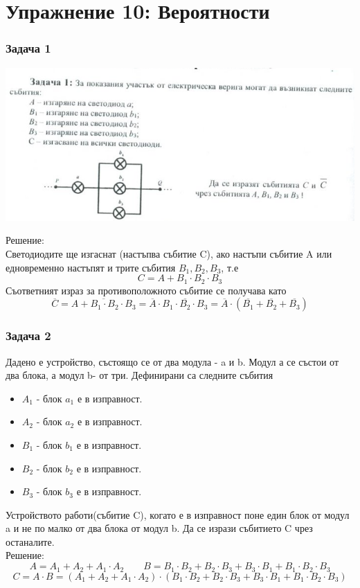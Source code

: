 \documentclass[fleqn, 12pt]{article}
\theoremstyle{definition}
\begin{document}
\newpage
\section{ Упражнение 10: Вероятности}

\subsubsection*{Задача 1}
\begin{center}
\includegraphics{Pics/Discrete math/ex10/ex10-task1.png}
\end{center}
Решение: \\
Светодиодите ще изгаснат (настъпва събитие C), ако настъпи събитие A или едновременно настъпят и трите събития $B_1, B_2, B_3$, т.е
$$C = A + B_1 \cdot B_2 \cdot B_3$$
Съответният израз за противоположното събитие се получава като
$$\overline{C} = \overline{A + B_1 \cdot B_2 \cdot B_3} = \overline{A} \cdot \overline{B_1 \cdot B_2 \cdot B_3} =  \overline{A} \cdot  ( \overline{B_1} +  \overline{B_2} +  \overline{B_3} )$$

\subsubsection*{Задача 2}
Дадено е устройство, състоящо се от два модула - a и b. Модул а се състои от два блока, а модул b- от три. Дефинирани са следните събития \\
\begin{itemize}
\item $A_1$ - блок $a_1$ е в изправност. 
\item $A_2$ - блок $a_2$ е в изправност. 
\item $B_1$ - блок $b_1$ е в изправност. 
\item $B_2$ - блок $b_2$ е в изправност. 
\item $B_3$ - блок $b_3$ е в изправност. 
\end{itemize}
Устройството работи(събитие C), когато е в изправност поне един блок от модул a и не по малко от два блока от модул b. Да се изрази събитието C чрез останалите. \\
Решение:\\
$$A = A_1 + A_2 + A_1 \cdot A_2 \qquad 
B = B_1 \cdot B_2 + B_2 \cdot B_3 + B_3 \cdot B_1 + B_1 \cdot B_2 \cdot B_3$$
$$C = A \cdot B = (A_1 + A_2 + A_1 \cdot A_2) \cdot 
(B_1 \cdot B_2 + B_2 \cdot B_3 + B_3 \cdot B_1 + B_1 \cdot B_2 \cdot B_3)$$
\end{document}
